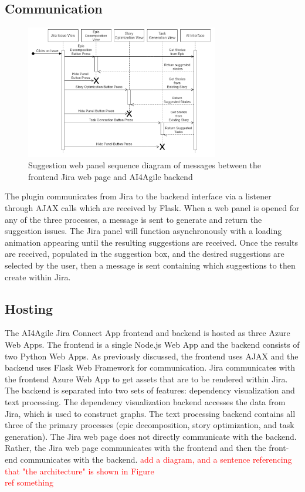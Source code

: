 \subsection{Communication}
\begin{figure}
\centering
\includegraphics[width=0.75\textwidth,keepaspectratio]{./figure/SequenceFlowDiagram.png}
\caption{Suggestion web panel sequence diagram of messages between the frontend Jira web page and AI4Agile backend}
\end{figure}

The plugin communicates from Jira to the backend interface via a listener through AJAX calls which are received by Flask. When a web panel is opened for any of the three processes, a message is sent to generate and return the suggestion issues. The Jira panel will function asynchronously with a loading animation appearing until the resulting suggestions are received. Once the results are received, populated in the suggestion box, and the desired suggestions are selected by the user, then a message is sent containing which suggestions to then create within Jira.

\subsection{Hosting}
\label{hosting}

The AI4Agile Jira Connect App frontend and backend is hosted as three Azure Web Apps. The frontend is a single Node.js Web App and the backend consists of two Python Web Apps. As previously discussed, the frontend uses AJAX and the backend uses Flask Web Framework for communication. Jira communicates with the frontend Azure Web App to get assets that are to be rendered within Jira. The backend is separated into two sets of features: dependency visualization and text processing. The dependency visualization backend accesses the data from Jira, which is used to construct graphs. The text processing backend contains all three of the primary processes (epic decomposition, story optimization, and task generation). The Jira web page does not directly communicate with the backend. Rather, the Jira web page communicates with the frontend and then the front-end communicates with the backend. \textcolor{red}{add a diagram, and a sentence referencing that "the architecture" is shown in Figure \\ref something}

